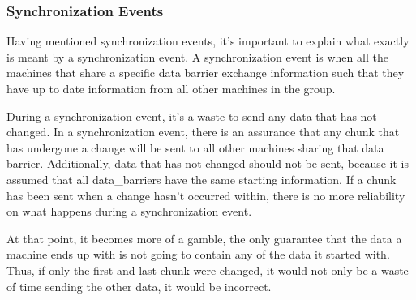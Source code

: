 \documentclass[../thesis.tex]{subfiles}
\begin{document}

  \subsubsection{Synchronization Events} %
  \label{ssub:synchronization_events}
    
    Having mentioned synchronization events, it's important to explain what exactly is meant by a synchronization event. A synchronization event is when all the machines that share a specific data barrier exchange information such that they have up to date information from all other machines in the group.
    
    During a synchronization event, it's a waste to send any data that has not changed. In a synchronization event, there is an assurance that any chunk that has undergone a change will be sent to all other machines sharing that data barrier. Additionally, data that has not changed should not be sent, because it is assumed that all data\_barriers have the same starting information. If a chunk has been sent when a change hasn't occurred within, there is no more reliability on what happens during a synchronization event.

    At that point, it becomes more of a gamble, the only guarantee that the data a machine ends up with is not going to contain any of the data it started with. Thus, if only the first and last chunk were changed, it would not only be a waste of time sending the other data, it would be incorrect.
\end{document}
